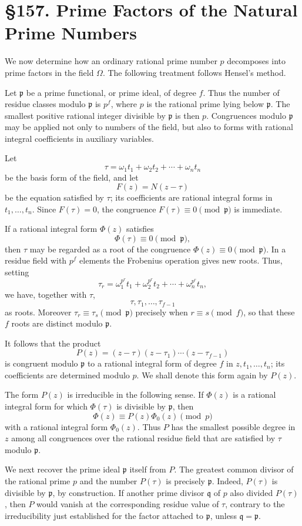 \documentclass[12pt,a4paper]{article}
\newcommand{\webersection}[2]{\clearpage\section*{\S #1. #2}}
\newcommand{\p}{\mathfrak p}
\newcommand{\q}{\mathfrak q}
\begin{document}
\webersection{157}{Prime Factors of the Natural Prime Numbers}

We now determine how an ordinary rational prime number \(p\) decomposes into prime factors in the field \(\Omega\).  The following treatment follows Hensel's method.

Let \(\p\) be a prime functional, or prime ideal, of degree \(f\).  Thus the number of residue classes modulo \(\p\) is \(p^f\), where \(p\) is the rational prime lying below \(\p\).  The smallest positive rational integer divisible by \(\p\) is then \(p\).  Congruences modulo \(\p\) may be applied not only to numbers of the field, but also to forms with rational integral coefficients in auxiliary variables.

Let
\[
  \tau=\omega_1t_1+\omega_2t_2+\cdots+\omega_n t_n
\]
be the basis form of the field, and let
\[
  F(z)=N(z-\tau)
\]
be the equation satisfied by \(\tau\); its coefficients are rational integral forms in \(t_1,\ldots,t_n\).  Since \(F(\tau)=0\), the congruence \(F(\tau)\equiv0\pmod{\p}\) is immediate.

If a rational integral form \(\Phi(z)\) satisfies
\[
  \Phi(\tau)\equiv0\pmod{\p},
\tag{1}
\]
then \(\tau\) may be regarded as a root of the congruence \(\Phi(z)\equiv0\pmod{\p}\).  In a residue field with \(p^f\) elements the Frobenius operation gives new roots.  Thus, setting
\[
  \tau_r=\omega_1^{p^r}t_1+\omega_2^{p^r}t_2+\cdots+\omega_n^{p^r}t_n,
\]
we have, together with \(\tau\),
\[
  \tau,\tau_1,\ldots,\tau_{f-1}
\]
as roots.  Moreover \(\tau_r\equiv\tau_s\pmod{\p}\) precisely when \(r\equiv s\pmod f\), so that these \(f\) roots are distinct modulo \(\p\).

It follows that the product
\[
  P(z)=(z-\tau)(z-\tau_1)\cdots(z-\tau_{f-1})
\tag{2}
\]
is congruent modulo \(\p\) to a rational integral form of degree \(f\) in \(z,t_1,\ldots,t_n\); its coefficients are determined modulo \(p\).  We shall denote this form again by \(P(z)\).

The form \(P(z)\) is irreducible in the following sense.  If \(\Phi(z)\) is a rational integral form for which \(\Phi(\tau)\) is divisible by \(\p\), then
\[
  \Phi(z)\equiv P(z)\Phi_0(z)\pmod p
\tag{3}
\]
with a rational integral form \(\Phi_0(z)\).  Thus \(P\) has the smallest possible degree in \(z\) among all congruences over the rational residue field that are satisfied by \(\tau\) modulo \(\p\).

We next recover the prime ideal \(\p\) itself from \(P\).  The greatest common divisor of the rational prime \(p\) and the number \(P(\tau)\) is precisely \(\p\).  Indeed, \(P(\tau)\) is divisible by \(\p\), by construction.  If another prime divisor \(\q\) of \(p\) also divided \(P(\tau)\), then \(P\) would vanish at the corresponding residue value of \(\tau\), contrary to the irreducibility just established for the factor attached to \(\p\), unless \(\q=\p\).
\end{document}
